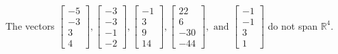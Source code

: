 \begin{exercise}
\begin{exerciseStatement}
  \end{exerciseStatement}
  \begin{exerciseAnswer}
   The vectors \(\left[\begin{array}{r}
-5 \\
-3 \\
3 \\
4
\end{array}\right] , \left[\begin{array}{r}
-3 \\
-3 \\
-1 \\
-2
\end{array}\right] , \left[\begin{array}{r}
-1 \\
3 \\
9 \\
14
\end{array}\right] , \left[\begin{array}{r}
22 \\
6 \\
-30 \\
-44
\end{array}\right] , \text{ and } \left[\begin{array}{r}
-1 \\
-1 \\
3 \\
1
\end{array}\right]\) 
  	 do not  
	span \(\mathbb{R}^4\).
  


  \end{exerciseAnswer}
\end{exercise}